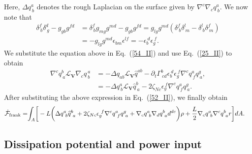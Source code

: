 Here, $\Delta q^{a}_{~ b}$ denotes the rough Laplacian on the surface given by $\nabla^c \nabla_c q^{a}_{~ b}$.
We now note that
\begin{align}   \label{55_II}
	\delta^f_{~b} \delta_{~g}^d-g_{gb} g^{fd}  &=    \delta^f_{~b} g_{mg} g^{md}-g_{gb} g^{fd}  = g_{lg}g^{md}\left(\delta_{~b}^f \delta_{~m}^l -\delta_{~b}^l \delta_{~m}^f  \right)  \\
	\nonumber	& = -g_{lg}g^{md}\epsilon_{bm} \epsilon^{lf} = -\epsilon_b^{~d} \epsilon_g^{~f}. 
\end{align}
We substitute the equation above in Eq.~(\ref{54_II}) and use Eq.~(\ref{25_II}) to obtain
\begin{align} \label{56_II}
	\nabla^c q^b_{~a} \mathcal{L}_{\bm{V}} \nabla_c q^{~a}_{~b} 	&= -\Delta q_{ab}\mathcal{L}_{\bm{V}}  \widehat{q}^{ab} - \partial_t \Gamma^b_{~cd} \epsilon_b^{~d} \epsilon_g^{~f} \nabla^c q_{~f}^a  q_{~a}^g , \nonumber
	\\  & =-\Delta q^{a}_{~b}\mathcal{L}_{\bm{V}} \widehat{q}_{~a}^b - 2 \zeta_{Nc} \epsilon_g^{~f} \nabla^c q^a_{~f} q_{~a}^g .
\end{align}
After substituting the above expression in Eq.~(\ref{52_II}), we finally obtain 
\begin{align}  \label{57_II}
	\dot{\mathcal{F}}_{\rm frank}  =  & {\int_A} \bigg[-L \bigg(\Delta q^a_{~b} \widehat{q}^b_{~a}  + 2 \zeta_{N c} \epsilon_g^{~f} \nabla^c q^a_{~f} q_{~a}^g + \nabla_c q^{a}_{~b} \nabla_d q_{~a}^b d^{dc} \bigg)\rho   +  \frac{L}{2} \nabla_c q^{a}_{~b}  \nabla^c q^{b}_{~a} r \bigg]d A .
\end{align}

\subsection{Dissipation potential and power input} 

